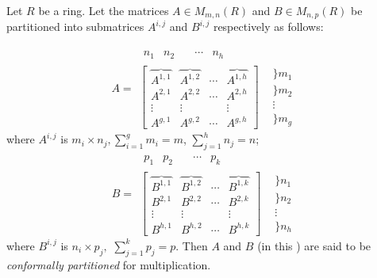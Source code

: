 \documentclass[12pt]{article}
\begin{document}
Let $R$ be a ring.
Let the matrices $A \in M_{m,n}(R)$ and $B \in M_{n,p}(R)$ be partitioned into 
submatrices $A^{i,j}$ and $B^{i,j}$ respectively as follows:

$$A=\begin{matrix} 
 \begin{matrix}
n_{1} & n_{2} & \quad \cdots & n_{h}  
\end{matrix}  & 
\begin{matrix}
\quad
\end{matrix} 
\\
\left[ \begin{matrix} 
\overbrace{A^{1,1}} & \overbrace{A^{1,2}} & \cdots & \overbrace{A^{1,h}} \\
A^{2,1} & A^{2,2} & \cdots & A^{2,h} \\
\vdots & \vdots & \ \ & \vdots \\
A^{g,1} & A^{g,2} & \cdots & A^{g,h} 
\end{matrix} \right] & 
\begin{matrix}
\}m_{1} \\
\}m_{2} \\
\vdots \\
\}m_{g} 
\end{matrix}
\end{matrix}
$$
where $A^{i,j}$ is $m_{i} \times n_{j}, \sum_{i=1}^{g} m_{i} = m$, 
$\sum_{j=1}^{h} n_{j} = n$; 
$$B=\begin{matrix} 
 \begin{matrix}
p_{1} & p_{2} & \quad \cdots & p_{k}  
\end{matrix}  & 
\begin{matrix}
\quad
\end{matrix} 
\\
\left[ \begin{matrix} 
\overbrace{B^{1,1}} & \overbrace{B^{1,2}} & \cdots & \overbrace{B^{1,k}} \\
B^{2,1} & B^{2,2} & \cdots & B^{2,k} \\
\vdots & \vdots & \ \ & \vdots \\
B^{h,1} & B^{h,2} & \cdots & B^{h,k} 
\end{matrix} \right] & 
\begin{matrix}
\}n_{1} \\
\}n_{2} \\
\vdots \\
\}n_{h} 
\end{matrix}
\end{matrix}
$$
where $B^{i,j}$ is $n_{i} \times p_{j}, $ 
$\sum_{j=1}^{k} p_{j} = p$. Then $A$ and $B$ (in this ) are said to be
{\it conformally partitioned} for multiplication.  
\end{document}

